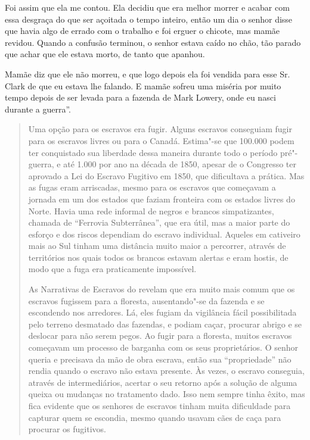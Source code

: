 Foi assim que ela me contou. Ela decidiu que era melhor morrer e acabar
com essa desgraça do que ser açoitada o tempo inteiro, então um dia o
senhor disse que havia algo de errado com o trabalho e foi erguer o
chicote, mas mamãe revidou. Quando a confusão terminou, o senhor estava
caído no chão, tão parado que achar que ele estava morto, de tanto que %
apanhou.

Mamãe diz que ele não morreu, e que logo depois ela foi vendida para
esse Sr. Clark de que eu estava lhe falando. E mamãe sofreu uma miséria
por muito tempo depois de ser levada para a fazenda de Mark Lowery, onde
eu nasci durante a guerra''.

\begin{quote}
Uma opção para os escravos era fugir. Alguns escravos conseguiam
fugir para os escravos livres ou para o Canadá. Estima"-se que 100.000
podem ter conquistado sua liberdade dessa maneira durante todo o período
pré"-guerra, e até 1.000 por ano na década de 1850, apesar de o Congresso
ter aprovado a Lei do Escravo Fugitivo em 1850, que dificultava a
prática. Mas as fugas eram arriscadas, mesmo para os escravos que
começavam a jornada em um dos estados que faziam fronteira com os
estados livres do Norte. Havia uma rede informal de negros e brancos
simpatizantes, chamada de ``Ferrovia Subterrânea'', que era útil, mas a
maior parte do esforço e dos riscos dependiam do escravo individual.
Aqueles em cativeiro mais ao Sul tinham uma distância muito maior a
percorrer, através de territórios nos quais todos os brancos estavam
alertas e eram hostis, de modo que a fuga era praticamente impossível.

As Narrativas de Escravos do  revelam que era muito mais comum
que os escravos fugissem para a floresta, ausentando"-se da fazenda e se
escondendo nos arredores. Lá, eles fugiam da vigilância fácil
possibilitada pelo terreno desmatado das fazendas, e podiam caçar,
procurar abrigo e se deslocar para não serem pegos. Ao fugir para a
floresta, muitos escravos começavam um processo de barganha com os seus
proprietários. O senhor queria e precisava da mão de obra escrava, então
sua ``propriedade'' não rendia quando o escravo não estava presente. Às
vezes, o escravo conseguia, através de intermediários, acertar o seu
retorno após a solução de alguma queixa ou mudanças no tratamento dado.
Isso nem sempre tinha êxito, mas fica evidente que os senhores de
escravos tinham muita dificuldade para capturar quem se escondia, mesmo
quando usavam cães de caça para procurar os fugitivos.
\end{quote}

